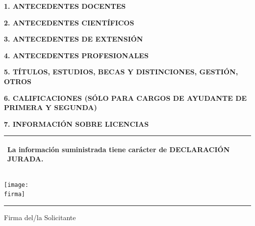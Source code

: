 \documentclass{article}
\newcommand{\titulosec}[1]{\textbf{\textsf{\MakeUppercase{#1}}}}
\newcommand{\recuadro}[1]{
    \begin{center}
    \begin{tabular}{|m{0.9\textwidth}|}
        \hline
        \begin{center}
        \textsf{\textbf{#1}}
        \end{center}
        \\
        \hline
    \end{tabular}
    \end{center}
  }
\begin{document}
  \noindent \titulosec{1. Antecedentes docentes}

  

  \noindent \titulosec{2. Antecedentes científicos}

  

  \noindent \titulosec{3. Antecedentes de extensión}

  

  \noindent \titulosec{4. Antecedentes profesionales}

  

  \noindent \titulosec{5. Títulos, estudios, becas y distinciones, gestión, otros}

  

  \noindent \titulosec{6. Calificaciones (sólo para cargos de Ayudante de Primera y Segunda)}

  

  \noindent \titulosec{7. Información sobre licencias}

  \licencias

  \recuadro{La información suministrada tiene carácter de DECLARACIÓN JURADA.}

  \vspace{100pt}

  \begin{center}
  \ifdefined\firma \texttt{[image: \\firma]}\fi

  \noindent\rule{5cm}{1pt}

  Firma del/la Solicitante
  \end{center}

  
\end{document}

